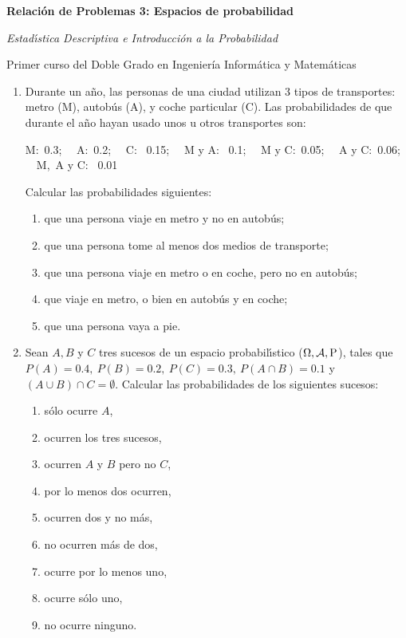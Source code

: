 \documentclass[11pt]{book}
\begin{document}
\centerline{\large \bf Relaci{\'o}n de Problemas 3: Espacios de probabilidad}
\smallskip \centerline{\large \it Estad{\'\i}stica Descriptiva e Introducci{\'o}n a la
Probabilidad}

\centerline{Primer curso del Doble Grado en Ingenier\'ia Inform\'atica y
Matem{\'a}ticas} \hrulefill \vskip 0.5cm
\begin{enumerate}

\item Durante un a{\~n}o,  las  personas  de  una  ciudad  utilizan  3  tipos  de
    transportes: metro (M),  autob{\'u}s  (A),  y  coche  particular  (C).  Las
    probabilidades  de  que  durante  el  a{\~n}o  hayan  usado  unos  u  otros
    transportes son:

    M:\ 0.3; \ \ A:\ 0.2; \ \ C: \ 0.15; \ \ M y A: \ 0.1; \ \ M y C:\ 0.05; \ \ A y C:\ 0.06; \ \ M,\ A y C: \ 0.01

    Calcular las probabilidades siguientes:
    \begin{enumerate}

      \item que una persona viaje en metro y no en autob{\'u}s;
       \item que una persona tome al menos dos medios de transporte;
       \item que una persona viaje en metro o en coche, pero no en autob{\'u}s;
      \item que viaje en metro,  o bien en autob{\'u}s y en coche;
      \item que una persona vaya a pie.
    \end{enumerate}

\item Sean $A, B$ y $C$ tres sucesos de un espacio probabil{\'\i}stico ($\Omega , \cal{A} ,\mbox{P}$),  tales
    que  $P(A)=0.4, \  P(B)=0.2, \  P(C)=0.3, \  P(A\cap B)=0.1$  y $(A\cup B)\cap C= \emptyset$.
    Calcular las probabilidades de los siguientes sucesos:
    \begin{enumerate}
      \item s{\'o}lo ocurre $A$,
      \item ocurren los tres sucesos,
      \item ocurren $A$ y $B$ pero no $C$,
      \item por lo menos dos ocurren,
      \item ocurren dos y no m{\'a}s,
      \item no ocurren m{\'a}s de dos,
      \item ocurre por lo menos uno,
      \item ocurre s{\'o}lo uno,
      \item no ocurre ninguno.
    \end{enumerate}


\end{enumerate}
\end{document}
